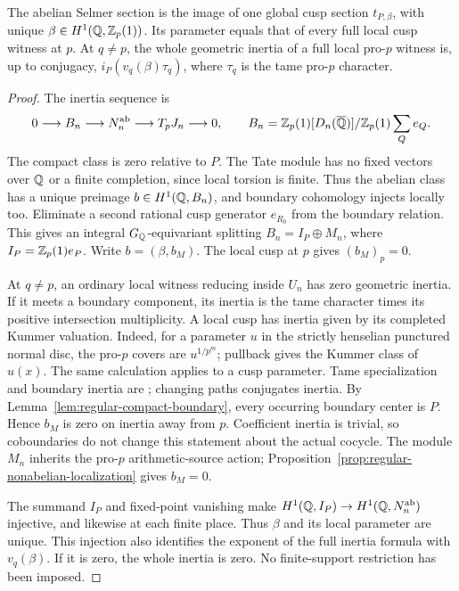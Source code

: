 \begin{lemma}
\label{lem:regular-abelian-packet}
The abelian Selmer section is the image of one global cusp section
$t_{P,\beta}$, with unique $\beta\in H^1(\mathbb Q,\mathbb Z_p(1))$. Its parameter
equals that of every full local cusp witness at $p$.
At $q\ne p$, the whole geometric inertia of a full local pro-$p$
witness is, up to conjugacy, $i_P(v_q(\beta)\tau_q)$, where
$\tau_q$ is the tame pro-$p$ character.
\end{lemma}
\begin{proof}
The inertia sequence is
\[
0\longrightarrow B_n\longrightarrow N_n^{\mathrm{ab}}
 \longrightarrow T_pJ_n\longrightarrow0,\qquad
B_n=\mathbb Z_p(1)[D_n(\overline{\mathbb Q})]/\mathbb Z_p(1)\sum_Qe_Q.
\]
The compact class is zero relative to $P$.
The Tate module has no fixed vectors over $\mathbb Q$ or a finite
completion, since local torsion is finite. Thus the abelian class
has a unique preimage $b\in H^1(\mathbb Q,B_n)$, and boundary cohomology
injects locally too. Eliminate a second rational cusp generator
$e_{R_0}$ from the boundary relation. This gives an integral
$G_\mathbb Q$-equivariant splitting $B_n=I_P\oplus M_n$, where
$I_P=\mathbb Z_p(1)e_P$. Write $b=(\beta,b_M)$. The local cusp at $p$
gives $(b_M)_p=0$.

At $q\ne p$, an ordinary local witness reducing inside $U_n$
has zero geometric inertia. If it meets a boundary component,
its inertia is the tame character times its positive intersection
multiplicity. A local cusp has inertia given by its completed
Kummer valuation. Indeed, for a parameter $u$ in the strictly
henselian punctured normal disc, the pro-$p$ covers are
$u^{1/p^m}$; pullback gives the Kummer class of $u(x)$.
The same calculation applies to a cusp parameter.
Tame specialization and boundary inertia are
\citet[Expos\'e~XIII, Corollary~2.9, \S2.10 and Lemma~2.11,
pp.~288--290]{SGA1}; changing paths conjugates inertia.
By Lemma~\ref{lem:regular-compact-boundary}, every occurring
boundary center is $P$. Hence $b_M$ is zero on inertia away
from $p$. Coefficient inertia is trivial, so coboundaries do
not change this statement about the actual cocycle.
The module $M_n$ inherits the pro-$p$ arithmetic-source action;
Proposition~\ref{prop:regular-nonabelian-localization} gives $b_M=0$.

The summand $I_P$ and fixed-point vanishing make
$H^1(\mathbb Q,I_P)\to H^1(\mathbb Q,N_n^{\mathrm{ab}})$ injective, and likewise
at each finite place. Thus $\beta$ and its local parameter are
unique. This injection also identifies the exponent of the full
inertia formula with $v_q(\beta)$. If it is zero, the whole
inertia is zero. No finite-support restriction has been imposed.
\end{proof}

